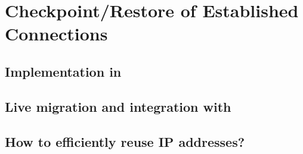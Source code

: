 \section{Checkpoint/Restore of Established Connections} \label{sec:system}

\subsection{Implementation in \criu}

\subsection{Live migration and integration with \runc}

\subsection{How to efficiently reuse IP addresses?}

